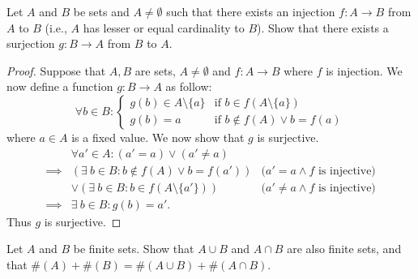 \begin{exercise}\label{ex 3.6.8}
  Let \(A\) and \(B\) be sets and \(A \neq \emptyset\) such that there exists an injection \(f : A \to B\) from \(A\) to \(B\) (i.e., \(A\) has lesser or equal cardinality to \(B\)).
  Show that there exists a surjection \(g : B \to A\) from \(B\) to \(A\).
\end{exercise}

\begin{proof}
  Suppose that \(A, B\) are sets, \(A \neq \emptyset\) and \(f : A \to B\) where \(f\) is injection.
  We now define a function \(g : B \to A\) as follow:
  \[
    \forall b \in B : \begin{cases}
      g(b) \in A \setminus \{a\} & \text{if } b \in f(A \setminus \{a\})  \\
      g(b) = a                   & \text{if } b \notin f(A) \lor b = f(a)
    \end{cases}
  \]
  where \(a \in A\) is a fixed value.
  We now show that \(g\) is surjective.
  \begin{align*}
             & \forall a' \in A : (a' = a) \lor (a' \neq a)                                                        \\
    \implies & (\exists\ b \in B : b \notin f(A) \lor b = f(a'))     & \text{(\(a' = a \land f\) is injective)}    \\
             & \lor (\exists\ b \in B : b \in f(A \setminus \{a'\})) & \text{(\(a' \neq a \land f\) is injective)} \\
    \implies & \exists\ b \in B : g(b) = a'.
  \end{align*}
  Thus \(g\) is surjective.
\end{proof}

\begin{exercise}\label{ex 3.6.9}
  Let \(A\) and \(B\) be finite sets.
  Show that \(A \cup B\) and \(A \cap B\) are also finite sets, and that \(\#(A) + \#(B) = \#(A \cup B) + \#(A \cap B)\).
\end{exercise}

